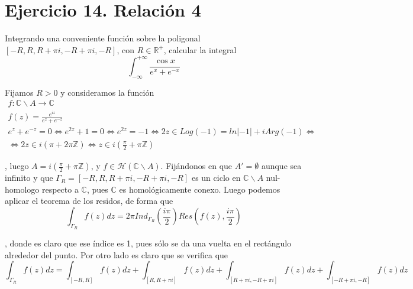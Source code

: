 \documentclass{article}
\begin{document}
\section{Ejercicio 14. Relación 4}
Integrando una conveniente función sobre la poligonal $[-R,R,R+\pi i,-R+\pi i,-R]$, con $R\in \mathbb{R}^+$, calcular la integral
\begin{equation*}
\int_{-\infty}^{+\infty}\frac{\cos{x}}{e^x+e^{-x}}
\end{equation*}

Fijamos $R>0$ y consideramos la función 
\begin{gather*}
f:\mathbb{C}\backslash A\longrightarrow \mathbb{C}\\
f(z)=\frac{e^{iz}}{e^z+e^{-z}}\\
e^z+e^{-z}=0\Leftrightarrow e^{2z}+1=0\Leftrightarrow e^{2z}=-1\Leftrightarrow 2z\in Log(-1)=ln|-1|+iArg(-1)\Leftrightarrow\\
\Leftrightarrow 2z\in i(\pi + 2\pi \mathbb{Z})\Leftrightarrow z\in i(\frac{\pi}{2}+\pi\mathbb{Z})
\end{gather*}

, luego $A=i(\frac{\pi}{2}+\pi\mathbb{Z})$, y $f\in \mathcal{H}(\mathbb{C}\backslash  A)$. Fijándonos en que $A'=\emptyset$ aunque sea infinito y que $\Gamma_R=[-R,R,R+\pi i,-R+\pi i,-R]$ es un ciclo en $\mathbb{C}\backslash A$ nul-homologo respecto a $\mathbb{C}$, pues $\mathbb{C}$ es homológicamente conexo. Luego podemos aplicar el teorema de los residos, de forma que
\begin{equation*}
\int_{\Gamma_R}f(z)dz=2\pi Ind_{\Gamma_R}(\frac{i\pi}{2})Res(f(z),\frac{i\pi}{2})
\end{equation*}

, donde es claro que ese índice es 1, pues sólo se da una vuelta en el rectángulo alrededor del punto. Por otro lado es claro que se verifica que
\begin{equation*}
\int_{\Gamma_R}f(z)dz=\int_{[-R,R]}f(z)dz+\int_{[R,R+\pi i]}f(z)dz+\int_{[R+\pi i,-R+\pi i]}f(z)dz+\int_{[-R+\pi i,-R]}f(z)dz
\end{equation*}
\end{document}
